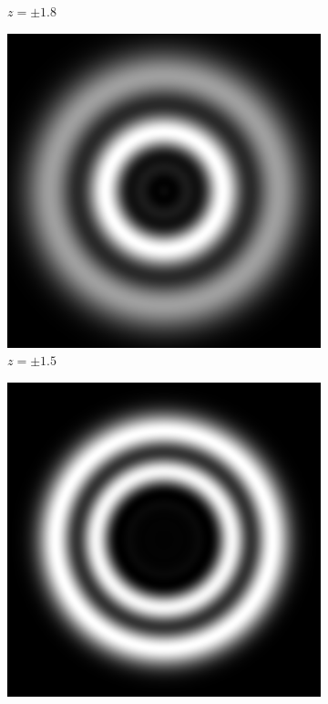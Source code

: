 \documentclass[11pt, a4paper, twoside]{article} %
\begin{document}
\begin{figure}[h!]
\begin{subfigure}[b]{0.245\linewidth}
    \caption{$z=\pm1.8$}
     \end{subfigure}
 \begin{subfigure}[b]{0.245\linewidth}
     \includegraphics[width=\linewidth]{simul5999.png}
    \caption{$z=\pm1.5$}
     \end{subfigure}
  \begin{subfigure}[b]{0.245\linewidth}
     \includegraphics[width=\linewidth]{simul59990.png}

\end{subfigure}
\end{figure}
\end{document}
